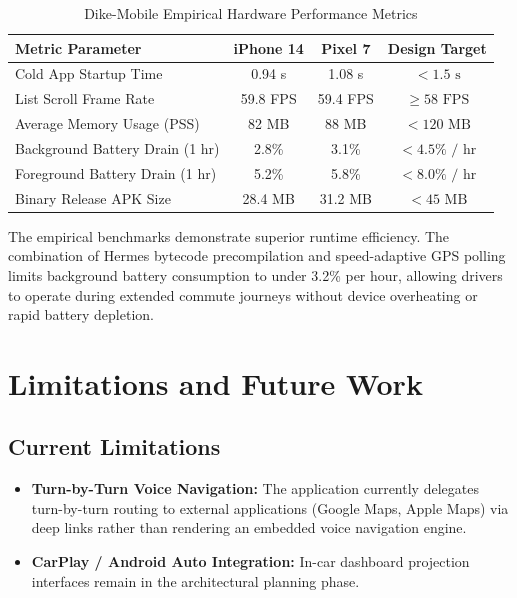 \documentclass[conference,10pt,a4paper]{IEEEtran}
\begin{document}
\begin{table}[!ht]
\caption{Dike-Mobile Empirical Hardware Performance Metrics}
\label{tab:mobile_benchmarks}
\centering
\scriptsize
\begin{tabularx}{\columnwidth}{Xccc}
\toprule
\textbf{Metric Parameter} & \textbf{iPhone 14} & \textbf{Pixel 7} & \textbf{Design Target} \\
\midrule
Cold App Startup Time & 0.94 s & 1.08 s & $< 1.5\text{ s}$ \\
List Scroll Frame Rate & 59.8 FPS & 59.4 FPS & $\ge 58\text{ FPS}$ \\
Average Memory Usage (PSS) & 82 MB & 88 MB & $< 120\text{ MB}$ \\
Background Battery Drain (1 hr) & 2.8\% & 3.1\% & $< 4.5\%\text{ / hr}$ \\
Foreground Battery Drain (1 hr) & 5.2\% & 5.8\% & $< 8.0\%\text{ / hr}$ \\
Binary Release APK Size & 28.4 MB & 31.2 MB & $< 45\text{ MB}$ \\
\bottomrule
\end{tabularx}
\end{table}

The empirical benchmarks demonstrate superior runtime efficiency. The combination of Hermes bytecode precompilation and speed-adaptive GPS polling limits background battery consumption to under 3.2\% per hour, allowing drivers to operate during extended commute journeys without device overheating or rapid battery depletion.

\section{Limitations and Future Work}

\subsection{Current Limitations}
\begin{itemize}
    \item \textbf{Turn-by-Turn Voice Navigation:} The application currently delegates turn-by-turn routing to external applications (Google Maps, Apple Maps) via deep links rather than rendering an embedded voice navigation engine.
    \item \textbf{CarPlay / Android Auto Integration:} In-car dashboard projection interfaces remain in the architectural planning phase.
\end{itemize}
\end{document}
